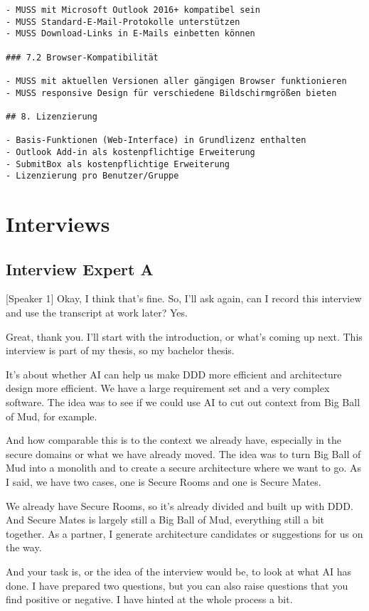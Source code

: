 \begin{verbatim}
- MUSS mit Microsoft Outlook 2016+ kompatibel sein
- MUSS Standard-E-Mail-Protokolle unterstützen
- MUSS Download-Links in E-Mails einbetten können

### 7.2 Browser-Kompatibilität

- MUSS mit aktuellen Versionen aller gängigen Browser funktionieren
- MUSS responsive Design für verschiedene Bildschirmgrößen bieten

## 8. Lizenzierung

- Basis-Funktionen (Web-Interface) in Grundlizenz enthalten
- Outlook Add-in als kostenpflichtige Erweiterung
- SubmitBox als kostenpflichtige Erweiterung
- Lizenzierung pro Benutzer/Gruppe
\end{verbatim}

\section{Interviews}

\subsection{Interview Expert A}\label{int:a}
[Speaker 1]
Okay, I think that's fine. So, I'll ask again, can I record this interview and use the transcript at work later? Yes.

Great, thank you. I'll start with the introduction, or what's coming up next. This interview is part of my thesis, so my bachelor thesis.

It's about whether AI can help us make DDD more efficient and architecture design more efficient. We have a large requirement set and a very complex software. The idea was to see if we could use AI to cut out context from Big Ball of Mud, for example.

And how comparable this is to the context we already have, especially in the secure domains or what we have already moved. The idea was to turn Big Ball of Mud into a monolith and to create a secure architecture where we want to go. As I said, we have two cases, one is Secure Rooms and one is Secure Mates.

We already have Secure Rooms, so it's already divided and built up with DDD. And Secure Mates is largely still a Big Ball of Mud, everything still a bit together. As a partner, I generate architecture candidates or suggestions for us on the way.

And your task is, or the idea of the interview would be, to look at what AI has done. I have prepared two questions, but you can also raise questions that you find positive or negative. I have hinted at the whole process a bit.

